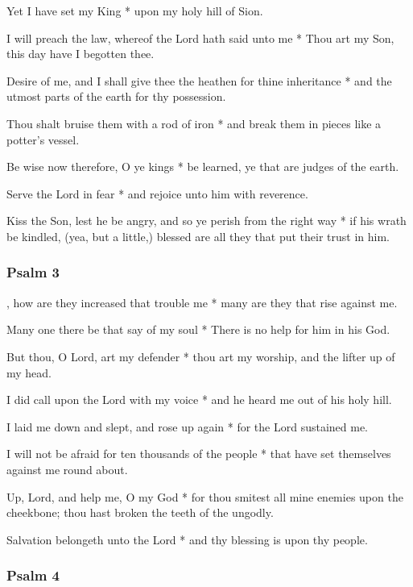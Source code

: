 Yet I have set my King * upon my holy hill of Sion.

I will preach the law, whereof the Lord hath said unto me * Thou art my Son, this day have I begotten thee.

Desire of me, and I shall give thee the heathen for thine inheritance * and the utmost parts of the earth for thy possession.

Thou shalt bruise them with a rod of iron * and break them in pieces like a potter's vessel.

Be wise now therefore, O ye kings * be learned, ye that are judges of the earth.

Serve the Lord in fear * and rejoice unto him with reverence.

Kiss the Son, lest he be angry, and so ye perish from the right way * if his wrath be kindled, (yea, but a little,) blessed are all they that put their trust in him.

\subsubsection{Psalm 3}


, how are they increased that trouble me * many are they that rise against me.

Many one there be that say of my soul * There is no help for him in his God.

But thou, O Lord, art my defender * thou art my worship, and the lifter up of my head.

I did call upon the Lord with my voice * and he heard me out of his holy hill.

I laid me down and slept, and rose up again * for the Lord sustained me.

I will not be afraid for ten thousands of the people * that have set themselves against me round about.

Up, Lord, and help me, O my God * for thou smitest all mine enemies upon the cheekbone; thou hast broken the teeth of the ungodly.

Salvation belongeth unto the Lord * and thy blessing is upon thy people.

\subsubsection{Psalm 4}


